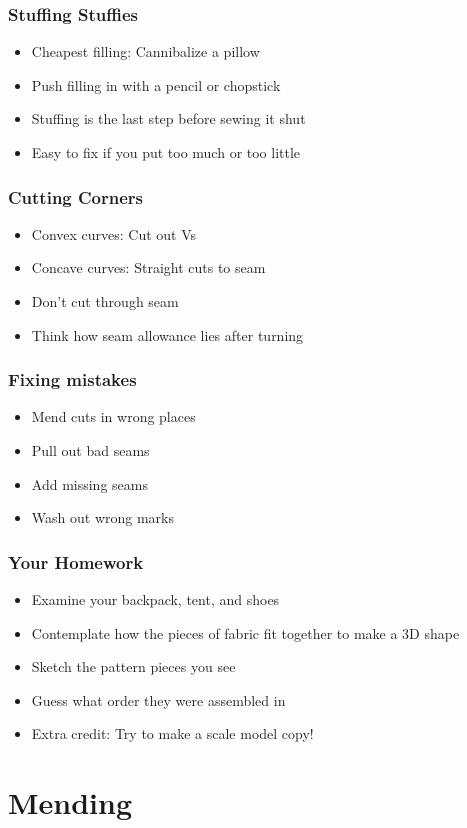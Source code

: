 \documentclass{beamer}
\begin{document}
\begin{frame}[fragile]
\frametitle{Stuffing Stuffies}
\begin{itemize}
\item Cheapest filling: Cannibalize a pillow
\item Push filling in with a pencil or chopstick
\item Stuffing is the last step before sewing it shut
\item Easy to fix if you put too much or too little
\end{itemize}
\end{frame}

\begin{frame}[fragile]
\frametitle{Cutting Corners}
\begin{itemize}
\item Convex curves: Cut out Vs
\item Concave curves: Straight cuts to seam
\item Don't cut through seam
\item Think how seam allowance lies after turning
\end{itemize}
\end{frame}


\begin{frame}[fragile]
\frametitle{Fixing mistakes}
\begin{itemize}
\item Mend cuts in wrong places
\item Pull out bad seams
\item Add missing seams
\item Wash out wrong marks
\end{itemize}
\end{frame}


\begin{frame}[fragile]
\frametitle{Your Homework}
\begin{itemize}
\item Examine your backpack, tent, and shoes
\item Contemplate how the pieces of fabric fit together to make a 3D shape
\item Sketch the pattern pieces you see
\item Guess what order they were assembled in
\item Extra credit: Try to make a scale model copy!
\end{itemize}
\end{frame}

\section{Mending}
\end{document}

